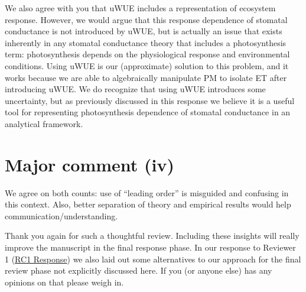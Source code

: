 \documentclass[12pt]{article}
\begin{document}
We also agree with you that uWUE includes a representation of ecosystem
response. However, we would argue that this response dependence of
stomatal conductance is not introduced by uWUE, but is actually an
issue that exists inherently in any stomatal conductance theory that
includes a photosynthesis term: photosynthesis depends on the
physiological response and environmental conditions. Using uWUE is our
(approximate) solution to this problem, and it works because we are
able to algebraically manipulate PM to isolate ET after introducing
uWUE. We do recognize that using uWUE introduces some uncertainty, but
as previously discussed in this response we believe it is a useful tool
for representing photosynthesis dependence of stomatal conductance in an
analytical framework.

\section{Major comment (iv)}

We agree on both counts: use of ``leading order'' is misguided and
confusing in this context. Also, better separation of theory and
empirical results would help communication/understanding.
\vspace{0.3in}

Thank you again for such a thoughtful review. Including these insights
will really improve the manuscript in the final response phase. In our
response to Reviewer 1
(\href{https://editor.copernicus.org/index.php/hess-2018-553-AC1.pdf?_mdl=msover_md&_jrl=13&_lcm=oc108lcm109w&_acm=get_comm_file&_ms=72556&c=153745&salt=1660920846993335212}{RC1
Response})
we also laid out some alternatives to our approach for the final
review phase not explicitly discussed here. If you (or anyone else)
has any opinions on that please weigh in.


\end{document}
